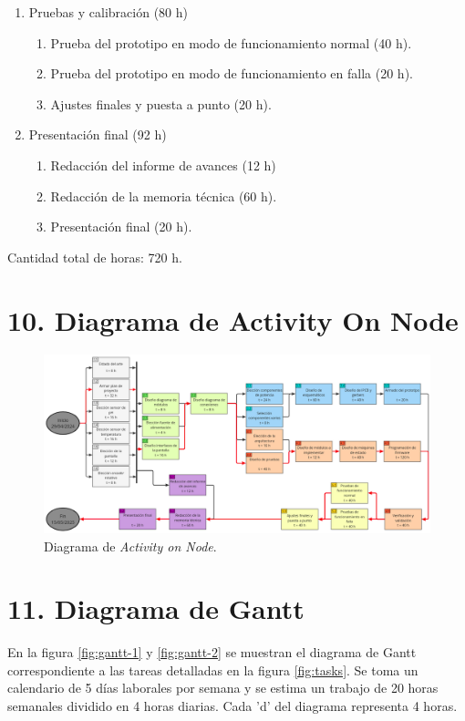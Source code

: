 \documentclass[
11pt, %
codirector, %
]{charter}
\begin{document}
\begin{enumerate}
\item Pruebas y calibración (80 h)
	\begin{enumerate}
	\item Prueba del prototipo en modo de funcionamiento normal (40 h).
	\item Prueba del prototipo en modo de funcionamiento en falla (20 h).
	\item Ajustes finales y puesta a punto (20 h).
	\end{enumerate}
	
\item Presentación final (92 h)
	\begin{enumerate}
	\item Redacción del informe de avances (12 h)
	\item Redacción de la memoria técnica (60 h).
	\item Presentación final (20 h).
	\end{enumerate}
\end{enumerate}

Cantidad total de horas: 720 h.

\section{10. Diagrama de Activity On Node}
\label{sec:AoN}

\begin{figure}[htpb]
\centering 
\includegraphics[width=1\textwidth]{./Figuras/AoN-1.png}
\caption{Diagrama de \textit{Activity on Node}.}
\label{fig:AoN}
\end{figure}

\section{11. Diagrama de Gantt}
\label{sec:gantt}

En la figura \ref{fig:gantt-1} y \ref{fig:gantt-2} se muestran el diagrama de Gantt correspondiente a las tareas detalladas en la figura \ref{fig:tasks}. Se toma un calendario de 5 días laborales por semana y se estima un trabajo de 20 horas semanales dividido en 4 horas diarias. Cada 'd' del diagrama representa 4 horas.
\end{document}
